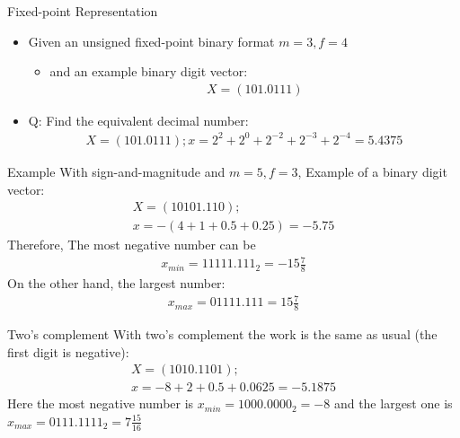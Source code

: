 \begin{parag}{Fixed-point Representation}
    \begin{itemize}
        \item Given an unsigned fixed-point binary format $m = 3, f = 4$
            \begin{itemize}
                \item and an example binary digit vector:
                    \begin{align*}
                        X = (101.0111)
                    \end{align*}
                    
            \end{itemize}
        \item Q: Find the equivalent decimal number:
            \begin{align*}
                X = (101.0111); x = 2^2 + 2^0 + 2^{-2} + 2^{-3} + 2^{-4} = 5.4375
            \end{align*}
    \end{itemize}
    \begin{subparag}{Example}
        With sign-and-magnitude and $m = 5, f = 3$, Example of a binary digit vector:
        \begin{align*}
            X = (10101.110);\\
            x = -(4 + 1 + 0.5 + 0.25) = -5.75
        \end{align*}
        Therefore, The most negative number can be
        \begin{align*}
            x_{min} = 11111.111_2 = -15 \frac{7}{8}
        \end{align*}
        On the other hand, the largest number:
        \begin{align*}
            x_{max} = 01111.111 = 15 \frac{7}{8}
        \end{align*}
    \end{subparag}
    \begin{subparag}{Two's complement}
        With two's complement the work is the same as usual (the first digit is negative):
        \begin{align*}
            X =  (1010.1101); \\
            x = -8 + 2 + 0.5 + 0.0625 = -5.1875
        \end{align*}
        Here the most negative number is $x_{min} = 1000.0000_2 = -8$ and the largest one is $x_{max} = 0111.1111_2 = 7 \frac{15}{16}$
        
    \end{subparag}
\end{parag}
